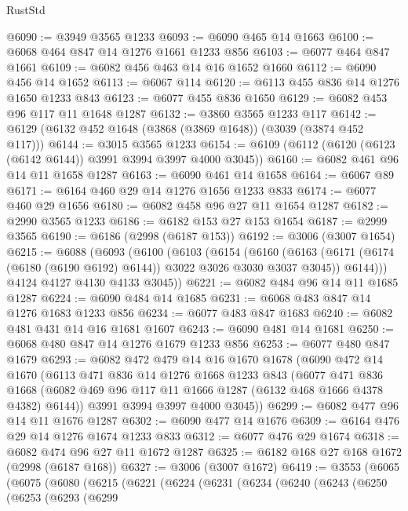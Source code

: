 \begin{lexlean}{RustStd}
\begin{coremodule}
@6090 := @3949 @3565 @1233
@6093 := @6090 @465 @14 @1663
@6100 := @6068 @464 @847 @14 @1276 @1661 @1233 @856
@6103 := @6077 @464 @847 @1661
@6109 := @6082 @456 @463 @14 @16 @1652 @1660
@6112 := @6090 @456 @14 @1652
@6113 := @6067 @114
@6120 := @6113 @455 @836 @14 @1276 @1650 @1233 @843
@6123 := @6077 @455 @836 @1650
@6129 := @6082 @453 @96 @117 @11 @1648 @1287
@6132 := @3860 @3565 @1233 @117
@6142 := @6129 (@6132 @452 @1648 (@3868 (@3869 @1648)) (@3039 (@3874 @452 @117)))
@6144 := @3015 @3565 @1233
@6154 := @6109 (@6112 (@6120 (@6123 (@6142 @6144)) @3991 @3994 @3997 @4000 @3045))
@6160 := @6082 @461 @96 @14 @11 @1658 @1287
@6163 := @6090 @461 @14 @1658
@6164 := @6067 @89
@6171 := @6164 @460 @29 @14 @1276 @1656 @1233 @833
@6174 := @6077 @460 @29 @1656
@6180 := @6082 @458 @96 @27 @11 @1654 @1287
@6182 := @2990 @3565 @1233
@6186 := @6182 @153 @27 @153 @1654
@6187 := @2999 @3565
@6190 := @6186 (@2998 (@6187 @153))
@6192 := @3006 (@3007 @1654)
@6215 := @6088
    (@6093
      (@6100
        (@6103
          (@6154
            (@6160
              (@6163 (@6171 (@6174 (@6180 (@6190 @6192) @6144)) @3022 @3026 @3030 @3037 @3045))
              @6144)))
        @4124
        @4127
        @4130
        @4133
        @3045))
@6221 := @6082 @484 @96 @14 @11 @1685 @1287
@6224 := @6090 @484 @14 @1685
@6231 := @6068 @483 @847 @14 @1276 @1683 @1233 @856
@6234 := @6077 @483 @847 @1683
@6240 := @6082 @481 @431 @14 @16 @1681 @1607
@6243 := @6090 @481 @14 @1681
@6250 := @6068 @480 @847 @14 @1276 @1679 @1233 @856
@6253 := @6077 @480 @847 @1679
@6293 := @6082
    @472
    @479
    @14
    @16
    @1670
    @1678
    (@6090
      @472
      @14
      @1670
      (@6113
        @471
        @836
        @14
        @1276
        @1668
        @1233
        @843
        (@6077
          @471
          @836
          @1668
          (@6082 @469 @96 @117 @11 @1666 @1287 (@6132 @468 @1666 @4378 @4382) @6144))
        @3991
        @3994
        @3997
        @4000
        @3045))
@6299 := @6082 @477 @96 @14 @11 @1676 @1287
@6302 := @6090 @477 @14 @1676
@6309 := @6164 @476 @29 @14 @1276 @1674 @1233 @833
@6312 := @6077 @476 @29 @1674
@6318 := @6082 @474 @96 @27 @11 @1672 @1287
@6325 := @6182 @168 @27 @168 @1672 (@2998 (@6187 @168))
@6327 := @3006 (@3007 @1672)
@6419 := @3553
    (@6065
      (@6075
        (@6080
          (@6215
            (@6221
              (@6224
                (@6231
                  (@6234
                    (@6240
                      (@6243
                        (@6250
                          (@6253
                            (@6293
                              (@6299

\end{coremodule}
\end{lexlean}
